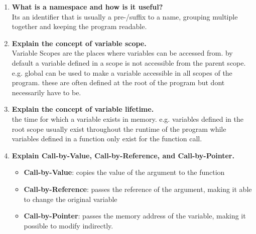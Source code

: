 \documentclass[a4paper]{article}
\begin{document}
\begin{enumerate}
    \item \textbf{What is a namespace and how is it useful?}\\
    Its an identifier that is usually a pre-/suffix to a name, grouping multiple together and keeping the program readable.

    \item \textbf{Explain the concept of variable scope.}\\
    Variable Scopes are the places where variables can be accessed from. by default a variable defined in a scope is not accessible from the parent scope. e.g. global can be used to make a variable accessible in all scopes of the program. these are often defined at the root of the program but dont necessarily have to be.

    \item \textbf{Explain the concept of variable lifetime.}\\
    the time for which a variable exists in memory. e.g. variables defined in the root scope usually exist throughout the runtime of the program while variables defined in a function only exist for the function call.

    \item \textbf{Explain Call-by-Value, Call-by-Reference, and Call-by-Pointer.}\\
    \begin{itemize}
        \item \textbf{Call-by-Value}: copies the value of the argument to the function
        \item \textbf{Call-by-Reference}: passes the reference of the argument, making it able to change the original variable
        \item \textbf{Call-by-Pointer}: passes the memory address of the variable, making it possible to modify indirectly.
    \end{itemize}
\end{enumerate}
\end{document}
